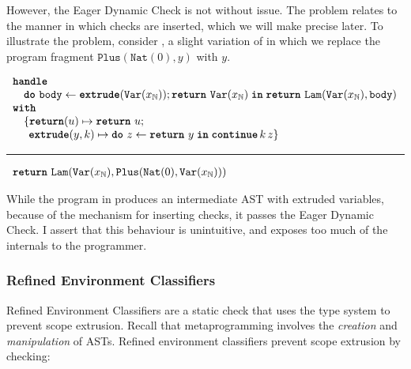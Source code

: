 However, the Eager Dynamic Check is not without issue. The problem relates to the 
manner in which checks are inserted, which we will make precise later. To illustrate the problem, consider , a slight variation of  in which we replace the program fragment $\texttt{Plus}({\texttt{Nat}({0})}, y)$ with $y$. 

\begin{code}
  \begin{efflst}
    $\begin{array}{l}
      \textbf{\texttt{handle}} \\
      \quad \texttt{\textbf{do}} \,\, {\texttt{body}} \leftarrow {\textbf{\texttt{extrude}}({\texttt{Var}(x_{\mathbb{N}})}); \texttt{\textbf{return}} \,\, {\texttt{Var}(x_{\mathbb{N}})}} \; \textbf{\texttt{in}} \; {\texttt{\textbf{return}} \,\, {\texttt{Lam}(\texttt{Var}(x_{\mathbb{N}}), \texttt{body})}} \\
      \textbf{\texttt{with}} \\
      \quad \{ \textbf{\texttt{return}}(u) \mapsto \texttt{\textbf{return}} \,\, {u}; \\
      \quad \; \, \textbf{\texttt{extrude}}(y, k) \mapsto { \texttt{\textbf{do}} \,\, {z} \leftarrow {\texttt{\textbf{return}} \,\, {y}} \; \textbf{\texttt{in}} \; {\textbf{\texttt{continue}} \, {k} \, {z}}} \}\\
    \end{array}$

    \vspace{2mm} 
\textcolor{effComment}{\hrule height 0.2mm \relax}
\vspace{2mm} 

\textcolor{effComment}{$\begin{array}{l}\texttt{\textbf{return}} \,\, {\texttt{Lam}(\texttt{Var}(x_{\mathbb{N}}), \texttt{Plus}(\texttt{Nat}({0}), \texttt{Var}(x_{\mathbb{N}})))}\end{array}$}

\end{efflst}
%
\label{listing:efflang-maybe-not-scope-extrusion}
\end{code}

While the program in  produces an intermediate AST with extruded variables, because of the mechanism for inserting checks, it passes the Eager Dynamic Check. I assert that this behaviour is unintuitive, and exposes too much of the internals to the programmer. 

\subsubsection{Refined Environment Classifiers}\label{subsubsection:refined-environment-classifiers}
Refined Environment Classifiers are a static check that uses the type system to prevent scope extrusion. Recall that metaprogramming involves the \textit{creation} and \textit{manipulation} of ASTs. Refined environment classifiers prevent scope extrusion by checking:


